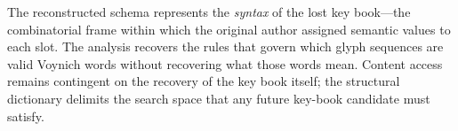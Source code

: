 The reconstructed schema represents the \emph{syntax} of the lost key
book---the combinatorial frame within which the original author assigned
semantic values to each slot. The analysis recovers the rules that
govern which glyph sequences are valid Voynich words without recovering
what those words mean. Content access remains contingent on the recovery
of the key book itself; the structural dictionary delimits the
search space that any future key-book candidate must satisfy.
